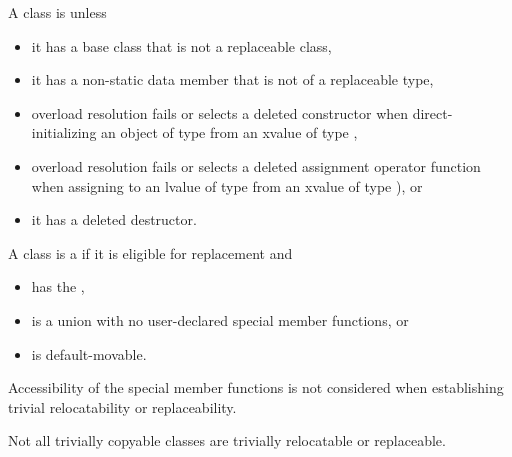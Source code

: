 \pnum
A class  is  unless
\begin{itemize}
\item it has a base class that is not a replaceable class,
\item it has a non-static data member that is not of a replaceable type,
\item overload resolution fails or selects a deleted constructor when
direct-initializing an object of type  from an xvalue of type
,

\item overload resolution fails or selects a deleted assignment operator
function when assigning to an lvalue of type  from an xvalue of type
 ), or

\item it has a deleted destructor.
\end{itemize}

\pnum
A class  is a  if it is
eligible for replacement and
\begin{itemize}
\item has the  ,
\item is a union with no user-declared special member functions, or
\item is default-movable.
\end{itemize}

\pnum
\begin{note}
Accessibility of the special member functions is not considered when
establishing trivial relocatability or replaceability.
\end{note}

\pnum
\begin{note}
Not all trivially copyable classes are trivially relocatable or replaceable.
\end{note}

